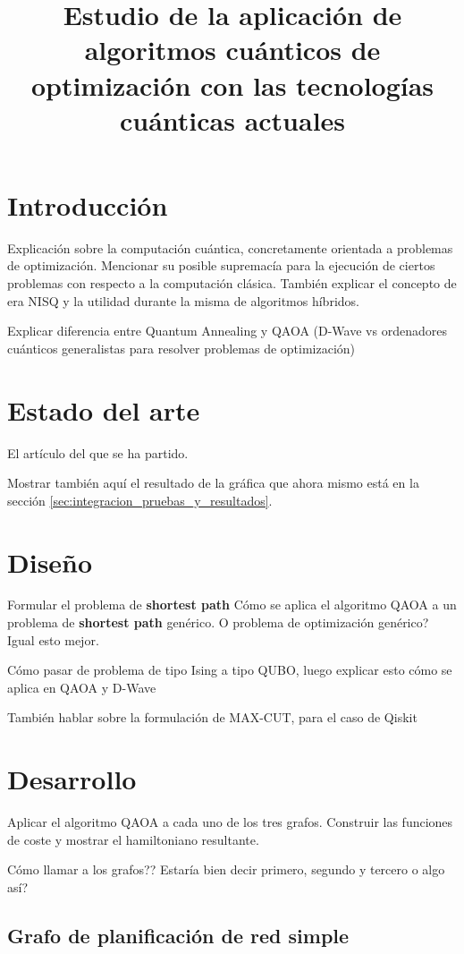 \documentclass{report}
\title{Estudio de la aplicación de algoritmos cuánticos de optimización con las tecnologías cuánticas actuales}
\begin{document}
\maketitle{}
\tableofcontents{}

\newpage

\chapter{Introducción}
Explicación sobre la computación cuántica, concretamente orientada a problemas de optimización. Mencionar su posible supremacía para la ejecución de ciertos problemas con respecto a la computación clásica. También explicar el concepto de era NISQ y la utilidad durante la misma de algoritmos híbridos.

Explicar diferencia entre Quantum Annealing y QAOA (D-Wave vs ordenadores cuánticos generalistas para resolver problemas de optimización)

\chapter{Estado del arte}
El artículo del que se ha partido.

Mostrar también aquí el resultado de la gráfica que ahora mismo está en la sección \ref{sec:integracion_pruebas_y_resultados}.

\chapter{Diseño}
Formular el problema de \textbf{shortest path}
Cómo se aplica el algoritmo QAOA a un problema de \textbf{shortest path} genérico. O problema de optimización genérico? Igual esto mejor.

Cómo pasar de problema de tipo Ising a tipo QUBO, luego explicar esto cómo se aplica en QAOA y D-Wave

También hablar sobre la formulación de MAX-CUT, para el caso de Qiskit

\chapter{Desarrollo}
Aplicar el algoritmo QAOA a cada uno de los tres grafos. Construir las funciones de coste y mostrar el hamiltoniano resultante.

Cómo llamar a los grafos?? Estaría bien decir primero, segundo y tercero o algo así?
\section{Grafo de planificación de red simple}
\end{document}
